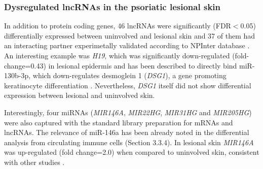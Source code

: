 \subsubsection{Dysregulated lncRNAs in the psoriatic lesional skin}

In addition to protein coding genes, 46 lncRNAs were significantly (FDR$<$0.05) differentially expressed between uninvolved and lesional skin and 37 of them had an interacting partner experimetally validated according to NPInter database \parencite{Hao2016}. An interesting  example was \textit{H19}, which was significantly down-regulated (fold-change=0.43) in lesional epidermis and has been described to directly bind miR-130b-3p, which down-regulates desmoglein 1 (\textit{DSG1}), a gene promoting keratinocyte differentiation \parencite{Li2017}. Nevertheless, \textit{DSG1} itself did not show differential expression between lesional and uninvolved skin. %

Interestingly, four miRNAs (\textit{MIR146A}, \textit{MIR22HG}, \textit{MIR31HG} and \textit{MIR205HG}) were also captured with the standard library preparation for mRNAs and lncRNAs. The relevance of miR-146a has been already noted in the differential analysis from circulating immune cells (Section 3.3.4). In lesional skin \textit{MIR146A} was up-regulated (fold change=2.0) when compared to uninvolved skin, consistent with other studies \parencite{Lerman2011, Tsoi2015}. %


